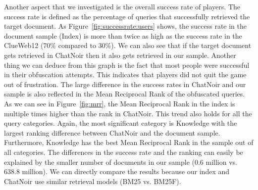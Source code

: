 Another aspect that we investigated is the overall success rate of players. The success rate is defined as the percentage of queries that successfully retrieved the target document. As Figure~\ref{fig:successrate:users} shows, the success rate in the document sample (Index) is more than twice as high as the success rate in the ClueWeb12 (70\% compared to 30\%). We can also see that if the target document gets retrieved in ChatNoir then it also gets retrieved in our sample. Another thing we can deduce from this graph is the fact that most people were successful in their obfuscation attempts. This indicates that players did not quit the game out of frustration. 
The large difference in the success rates in ChatNoir and our sample is also reflected in the Mean Reciprocal Rank of the obfuscated queries. As we can see in Figure~\ref{fig:mrr}, the Mean Reciprocal Rank in the index is multiple times higher than the rank in ChatNoir. This trend also holds for all the query categories. Again, the most significant category is Knowledge with the largest ranking difference between ChatNoir and the document sample. Furthermore, Knowledge has the best Mean Reciprocal Rank in the sample out of all categories.
The differences in the success rate and the ranking can easily be explained by the smaller number of documents in our sample (0.6 million vs. 638.8 million).
We can directly compare the results because  our index and ChatNoir use similar retrieval models (BM25 vs. BM25F).\par


